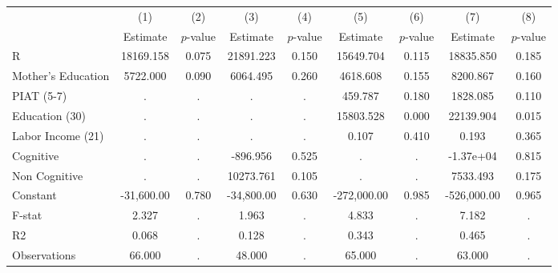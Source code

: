 \begin{tabular}{lcccccccc} \toprule
 & (1) & (2) & (3) & (4) & (5) & (6) & (7) & (8) \\ 
 & Estimate  & $p$-value  & Estimate  & $p$-value  & Estimate  & $p$-value  & Estimate  & $p$-value  \\  \midrule
R & 18169.158 &     0.075 & 21891.223 &     0.150 & 15649.704 &     0.115 & 18835.850 &     0.185 \\  
Mother's Education &  5722.000 &     0.090 &  6064.495 &     0.260 &  4618.608 &     0.155 &  8200.867 &     0.160 \\  
PIAT (5-7) &         . &         . &         . &         . &   459.787 &     0.180 &  1828.085 &     0.110 \\  
Education (30) &         . &         . &         . &         . & 15803.528 &     0.000 & 22139.904 &     0.015 \\  
Labor Income (21) &         . &         . &         . &         . &     0.107 &     0.410 &     0.193 &     0.365 \\  
Cognitive &         . &         . &  -896.956 &     0.525 &         . &         . & -1.37e+04 &     0.815 \\  
Non Cognitive &         . &         . & 10273.761 &     0.105 &         . &         . &  7533.493 &     0.175 \\  
Constant & -31,600.00 &     0.780 & -34,800.00 &     0.630 & -272,000.00 &     0.985 & -526,000.00 &     0.965 \\  \midrule
F-stat &     2.327 &         . &     1.963 &         . &     4.833 &         . &     7.182 &         . \\  \midrule 
R2 &     0.068 &         . &     0.128 &         . &     0.343 &         . &     0.465 &         . \\  
Observations &    66.000 &         . &    48.000 &         . &    65.000 &         . &    63.000 &         . \\  
\bottomrule \end{tabular}
